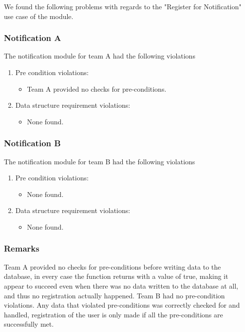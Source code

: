 We found the following problems with regards to the "Register for Notification" use case of the module.
\subsubsection*{Notification A}
The notification module for team A had the following violations
\begin{enumerate}
    \item Pre condition violations:
    \begin{itemize}
        \item Team A provided no checks for pre-conditions.
    \end{itemize}
    \item Data structure requirement violations:
    \begin{itemize}
        \item None found.
    \end{itemize}
\end{enumerate}
\subsubsection*{Notification B}
The notification module for team B had the following violations
\begin{enumerate}
    \item Pre condition violations:
    \begin{itemize}
         \item None found.
    \end{itemize}
    \item Data structure requirement violations:
    \begin{itemize}
        \item None found.
    \end{itemize}
\end{enumerate}
\subsubsection*{Remarks}
Team A provided no checks for pre-conditions  before writing data to the database, in every case the function returns with a value of true, making it appear to succeed even when there was no data written to the database at all, and thus no registration actually happened.\newline
Team B had no pre-condition violations. Any data that violated pre-conditions was correctly checked for and handled, registration of the user is only made if all the pre-conditions are successfully met.
